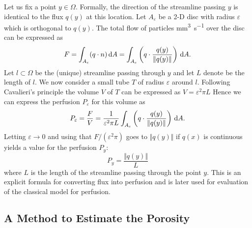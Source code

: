 \documentclass[paper=a4, fontsize=12pt,parskip=half,headings=small]{scrartcl}
\newcommand{\siqt}{\cubic\milli\meter\per\second}
\begin{document}
	Let us fix a point $y \in \Omega$.
	Formally, the direction of the streamline passing $y$ is identical to the flux $q(y)$ at this location. 
	Let $A_\varepsilon$ be a 2-D disc with radius $\varepsilon$ which is orthogonal to $q(y)$.
	The total flow of particles \si{\siqt} over the disc can be expressed as
	\[
		F = \int_{A_\varepsilon} (q \cdot n) \,\mathrm{d} A = \int_{A_\varepsilon} \left(q\cdot \frac{q(y)}{\Vert q(y) \Vert}\right) \,\mathrm{d} A.
	\]
	Let $l \subset \Omega$ be the (unique) streamline passing through $y$ and let $L$ denote be the length of $l$.
	We now consider a small tube $T$ of radius $\varepsilon$ around $l$.
	Following Cavalieri's principle the volume $V$ of $T$ can be expressed as $V = \varepsilon^2\pi L$
	Hence we can express the perfusion $P_\varepsilon$ for this volume as
	\[
		P_\varepsilon = \frac{F}{V} = \frac{1}{\varepsilon^2 \pi L} \int_{A_\varepsilon} \left( q\cdot \frac{q(y)}{\Vert q(y) \Vert} \right) \,\mathrm{d} A. 
	\]
	Letting $\varepsilon \to 0$ and using that $F/(\varepsilon^2\pi)$ goes to $\Vert q(y) \Vert$ if $q(x)$ is continuous yields a value for the perfusion $P_{y}$:
	\begin{equation}
		P_{y} = \frac{\Vert q(y) \Vert}{L}
		\label{eq:flux2perf}
	\end{equation}
	where $L$ is the length of the streamline passing through the point $y$. 
	This is an explicit formula for converting flux into perfusion and is later used for evaluation of the classical model for perfusion. 


	\subsection{A Method to Estimate the Porosity}\label{sec:CBV}
	
\end{document}
